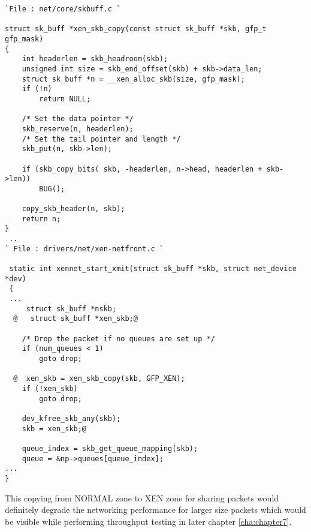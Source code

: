 \begin{lstlisting}[caption= Code snippet of function for copying entire network packet from NORMAL memory to XEN memory zone ,label={xen_skb_copy},frame=single,style=base]
`File : net/core/skbuff.c `

struct sk_buff *xen_skb_copy(const struct sk_buff *skb, gfp_t gfp_mask)
{
    int headerlen = skb_headroom(skb);
    unsigned int size = skb_end_offset(skb) + skb->data_len;
    struct sk_buff *n = __xen_alloc_skb(size, gfp_mask);
    if (!n)
        return NULL;

    /* Set the data pointer */
    skb_reserve(n, headerlen);
    /* Set the tail pointer and length */
    skb_put(n, skb->len);

    if (skb_copy_bits( skb, -headerlen, n->head, headerlen + skb->len))
        BUG();

    copy_skb_header(n, skb);
    return n;
}
 ..
` File : drivers/net/xen-netfront.c `
 
 static int xennet_start_xmit(struct sk_buff *skb, struct net_device *dev)
 {
 ...
     struct sk_buff *nskb;
  @   struct sk_buff *xen_skb;@

    /* Drop the packet if no queues are set up */
    if (num_queues < 1)
        goto drop;
        
  @  xen_skb = xen_skb_copy(skb, GFP_XEN);
    if (!xen_skb)
        goto drop;
 
    dev_kfree_skb_any(skb);
    skb = xen_skb;@

    queue_index = skb_get_queue_mapping(skb);
    queue = &np->queues[queue_index];
...
}

\end{lstlisting}

This copying from NORMAL zone to XEN zone for sharing packets would definitely degrade the networking performance for larger size packets which would be visible while performing throughput testing in later chapter \ref{cha:chapter7}.

